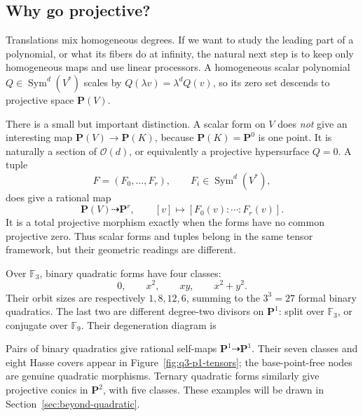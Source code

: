 \documentclass[11pt]{article}
\theoremstyle{definition}
\theoremstyle{plain}
\theoremstyle{remark}
\newcommand{\F}{\mathbb F}
\newcommand{\Sym}{\operatorname{Sym}}
\begin{document}
\subsection*{Why go projective?}

Translations mix homogeneous degrees.  If we want to study the leading part
of a polynomial, or what its fibers do at infinity, the natural next step is
to keep only homogeneous maps and use linear processors.  A homogeneous
scalar polynomial \(Q\in\Sym^d(V^*)\) scales by
\(Q(\lambda v)=\lambda^dQ(v)\), so its zero set descends to projective space
\(\mathbf P(V)\).

There is a small but important distinction.  A scalar form on \(V\) does
\emph{not} give an interesting map \(\mathbf P(V)\to\mathbf P(K)\), because
\(\mathbf P(K)=\mathbf P^0\) is one point.  It is naturally a section of
\(\mathcal O(d)\), or equivalently a projective hypersurface \(Q=0\).  A tuple
\[
  F=(F_0,\ldots,F_r),\qquad F_i\in\Sym^d(V^*),
\]
does give a rational map
\[
  \mathbf P(V)\dashrightarrow\mathbf P^r,
  \qquad [v]\longmapsto[F_0(v):\cdots:F_r(v)].
\]
It is a total projective morphism exactly when the forms have no common
projective zero.  Thus scalar forms and tuples belong in the same tensor
framework, but their geometric readings are different.

Over \(\F_3\), binary quadratic forms have four classes:
\[
  0,\qquad x^2,\qquad xy,\qquad x^2+y^2.
\]
Their orbit sizes are respectively \(1,8,12,6\), summing to the
\(3^3=27\) formal binary quadratics.
The last two are different degree-two divisors on \(\mathbf P^1\): split over
\(\F_3\), or conjugate over \(\F_9\).  Their degeneration diagram is
\begin{center}
\end{center}
Pairs of binary quadratics give rational self-maps
\(\mathbf P^1\dashrightarrow\mathbf P^1\).  Their seven classes and eight
Hasse covers appear in Figure~\ref{fig:q3-p1-tensors}; the base-point-free
nodes are genuine quadratic morphisms.  Ternary quadratic forms similarly
give projective conics in \(\mathbf P^2\), with five classes.  These examples
will be drawn in Section~\ref{sec:beyond-quadratic}.
\end{document}
